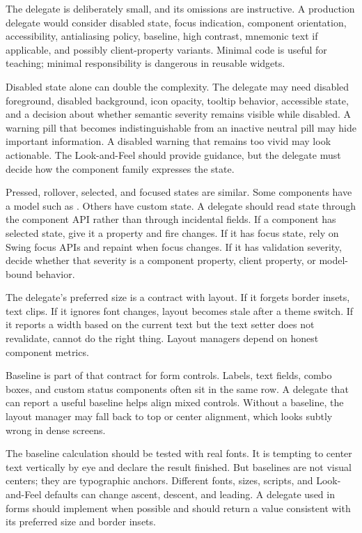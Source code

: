 The delegate is deliberately small, and its omissions are instructive. A production delegate would consider disabled state, focus indication, component orientation, accessibility, antialiasing policy, baseline, high contrast, mnemonic text if applicable, and possibly client-property variants. Minimal code is useful for teaching; minimal responsibility is dangerous in reusable widgets.

Disabled state alone can double the complexity. The delegate may need disabled foreground, disabled background, icon opacity, tooltip behavior, accessible state, and a decision about whether semantic severity remains visible while disabled. A warning pill that becomes indistinguishable from an inactive neutral pill may hide important information. A disabled warning that remains too vivid may look actionable. The Look-and-Feel should provide guidance, but the delegate must decide how the component family expresses the state.

Pressed, rollover, selected, and focused states are similar. Some components have a model such as . Others have custom state. A delegate should read state through the component API rather than through incidental fields. If a component has selected state, give it a property and fire changes. If it has focus state, rely on Swing focus APIs and repaint when focus changes. If it has validation severity, decide whether that severity is a component property, client property, or model-bound behavior.

The delegate's preferred size is a contract with layout. If it forgets border insets, text clips. If it ignores font changes, layout becomes stale after a theme switch. If it reports a width based on the current text but the text setter does not revalidate, \miglayout{} cannot do the right thing. Layout managers depend on honest component metrics.

Baseline is part of that contract for form controls. Labels, text fields, combo boxes, and custom status components often sit in the same row. A delegate that can report a useful baseline helps \miglayout{} align mixed controls. Without a baseline, the layout manager may fall back to top or center alignment, which looks subtly wrong in dense screens.

The baseline calculation should be tested with real fonts. It is tempting to center text vertically by eye and declare the result finished. But baselines are not visual centers; they are typographic anchors. Different fonts, sizes, scripts, and Look-and-Feel defaults can change ascent, descent, and leading. A delegate used in forms should implement  when possible and should return a value consistent with its preferred size and border insets.

